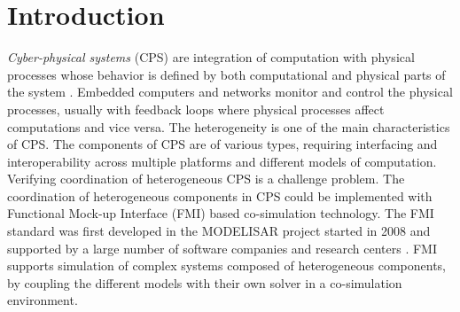\section{Introduction}

\textit{Cyber-physical systems} (CPS) are integration of computation with physical processes whose behavior is defined by both computational and physical parts of the system \cite{Zanero17}. Embedded computers and networks monitor and control the physical processes, usually with feedback loops where physical processes affect computations and vice versa. The heterogeneity is one of the main characteristics of CPS. The components of CPS are of various types, requiring interfacing and interoperability across multiple platforms and different models of computation. Verifying coordination of heterogeneous CPS is a challenge problem. The coordination of heterogeneous components in CPS could be implemented with Functional Mock-up Interface (FMI) based co-simulation technology. The FMI standard was first developed in the MODELISAR project started in 2008 and supported by a large number of software companies and research centers \cite{ClauMODELISAR}. FMI supports simulation of complex systems composed of heterogeneous components, by coupling the different models with their own solver in a co-simulation environment.

